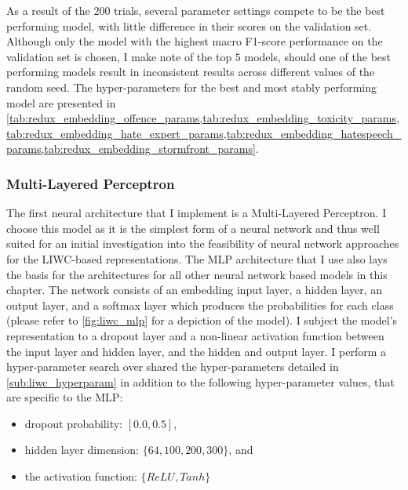 As a result of the $200$ trials, several parameter settings compete to be the best performing model, with little difference in their scores on the validation set. Although only the model with the highest macro F1-score performance on the validation set is chosen, I make note of the top $5$ models, should one of the best performing models result in inconsistent results across different values of the random seed. The hyper-parameters for the best and most stably performing model are presented in \cref{tab:redux_embedding_offence_params,tab:redux_embedding_toxicity_params,tab:redux_embedding_hate_expert_params,tab:redux_embedding_hatespeech_params,tab:redux_embedding_stormfront_params}.

\subsubsection{Multi-Layered Perceptron}

The first neural architecture that I implement is a Multi-Layered Perceptron. I choose this model as it is the simplest form of a neural network and thus well suited for an initial investigation into the feasibility of neural network approaches for the LIWC-based representations. The MLP architecture that I use also lays the basis for the architectures for all other neural network based models in this chapter. The network consists of an embedding input layer, a hidden layer, an output layer, and a softmax layer which produces the probabilities for each class (please refer to \cref{fig:liwc_mlp} for a depiction of the model). I subject the model's representation to a dropout layer and a non-linear activation function between the input layer and hidden layer, and the hidden and output layer.
I perform a hyper-parameter search over shared the hyper-parameters detailed in \cref{sub:liwc_hyperparam} in addition to the following hyper-parameter values, that are specific to the MLP:

\begin{itemize}
  \item dropout probability: $[0.0, 0.5]$,
  \item hidden layer dimension: $\{64, 100, 200, 300\}$, and
  \item the activation function: $\{ReLU, Tanh\}$
\end{itemize}

